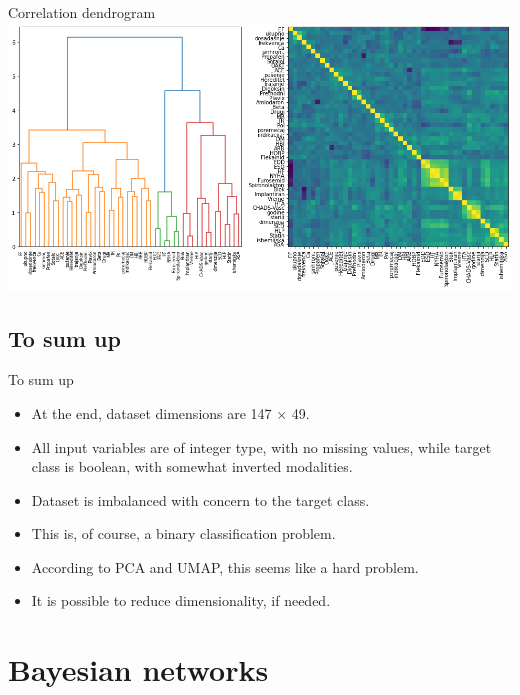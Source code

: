 \documentclass[hyperref={bookmarks=false}]{beamer}
\begin{document}
\begin{frame}{Correlation dendrogram}
\includegraphics[width=\textwidth]{dendro.png}
\end{frame}

\subsection{To sum up}
\begin{frame}{To sum up}
\begin{itemize}
    \item At the end, dataset dimensions are 147 × 49.

    \item All input variables are of integer type, with no missing values, while target class is boolean, with somewhat inverted modalities.

    \item Dataset is imbalanced with concern to the target class.

    \item This is, of course, a binary classification problem.

    \item According to PCA and UMAP, this seems like a hard problem.
    
    \item It is possible to reduce dimensionality, if needed.
\end{itemize}
\end{frame}

\section{Bayesian networks}
\end{document}
